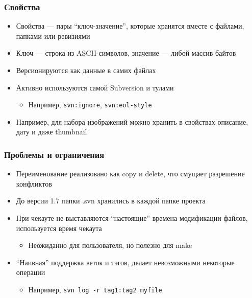 \documentclass[xetex,mathserif,serif]{beamer}
\begin{document}
    \begin{frame}[fragile]
        \frametitle{Свойства}
        \begin{itemize}
            \item Свойства --- пары ``ключ-значение'', которые хранятся вместе с файлами, папками или ревизиями
            \item Ключ --- строка из ASCII-символов, значение --- либой массив байтов
            \item Версионируются как данные в самих файлах
            \item Активно используются самой Subversion и тулами
            \begin{itemize}
                \item Например, \verb|svn:ignore|, \verb|svn:eol-style|
            \end{itemize}
            \item Например, для набора изображений можно хранить в свойствах описание, дату и даже thumbnail
        \end{itemize}
    \end{frame}

    \begin{frame}[fragile]
        \frametitle{Проблемы и ограничения}
        \begin{itemize}
            \item Переименование реализовано как copy и delete, что смущает разрешение конфликтов
            \item До версии 1.7 папки .svn хранились в каждой папке проекта
            \item При чекауте не выставляются ``настоящие'' времена модификации файлов, используется время чекаута
            \begin{itemize}
                \item Неожиданно для пользователя, но полезно для make
            \end{itemize}
            \item ``Наивная'' поддержка веток и тэгов, делает невозможными некоторые операции
            \begin{itemize}
                \item Например, \verb|svn log -r tag1:tag2 myfile|
            \end{itemize}
        \end{itemize}
    \end{frame}
\end{document}
